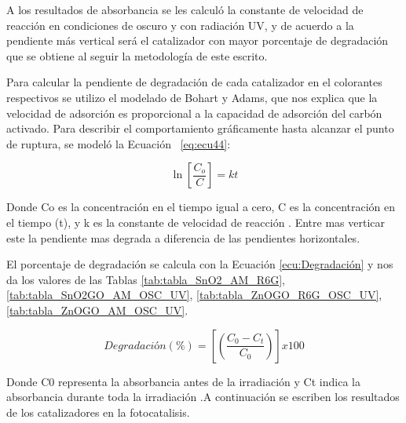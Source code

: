 \documentclass[12pt]{article}
\begin{document}
A los resultados de absorbancia se les calculó la constante de velocidad de reacción en condiciones de oscuro y con radiación UV, y de acuerdo a la pendiente más vertical será el catalizador con mayor porcentaje de degradación que se obtiene al seguir la metodología de este escrito. \vspace{1em} %

Para calcular la pendiente de degradación de cada catalizador en el colorantes respectivos se utilizo el modelado de Bohart y Adams, que nos explica que la velocidad de adsorción es proporcional a la capacidad de adsorción del carbón activado. Para describir el comportamiento gráficamente hasta alcanzar el punto de ruptura, se modeló la Ecuación ~\ref{eq:ecu44}:\vspace{1em} %

\begin{equation}
\ln\left[\frac{C_{o}}{C}\right] =kt
\label{eq:ecu44}
\end{equation}

Donde Co es la concentración en el tiempo igual a cero, C es la concentración en el tiempo (t), y k es la constante de velocidad de reacción \cite{IEEEreferencias:OscarZnO}. Entre mas verticar este la pendiente mas degrada a diferencia de las pendientes horizontales.\vspace{1em} %

El porcentaje de degradación se calcula con la Ecuación \ref{ecu:Degradación} y nos da los valores de las Tablas \ref{tab:tabla_SnO2_AM_R6G}, \ref{tab:tabla_SnO2GO_AM_OSC_UV}, \ref{tab:tabla_ZnOGO_R6G_OSC_UV}, \ref{tab:tabla_ZnOGO_AM_OSC_UV}.

\begin{equation}
\label{ecu:Degradación}
Degradación( \%) =\left[\left(\frac{C_{0} -C_{t}}{C_{0}}\right)\right] x100
\end{equation}

Donde C0 representa la absorbancia antes de la irradiación y Ct indica la absorbancia durante toda la irradiación \cite{IEEEreferencias:ZnOGO_Fotocatalisis_6}.A continuación se escriben los resultados de los catalizadores en la fotocatalisis.
\end{document}
